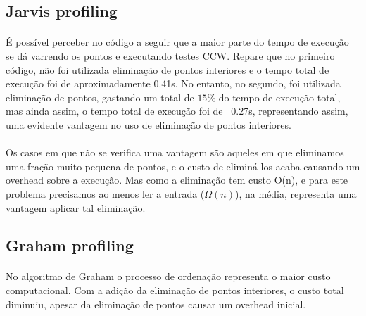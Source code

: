 \documentclass[11pt,a4paper]{article}
\begin{document}
        \subsection{Jarvis profiling}
        \paragraph{}
        É possível perceber no código a seguir que a maior parte do tempo de execução se dá varrendo os pontos e executando testes CCW. Repare que no primeiro código, não foi utilizada eliminação de pontos interiores e o tempo total de execução foi de aproximadamente 0.41s. No entanto, no segundo, foi utilizada eliminação de pontos, gastando um total de $15\%$ do tempo de execução total, mas ainda assim, o tempo total de execução foi de ~0.27s, representando assim, uma evidente vantagem no uso de eliminação de pontos interiores.

        \paragraph{}
        Os casos em que não se verifica uma vantagem são aqueles em que eliminamos uma fração muito pequena de pontos, e o custo de eliminá-los acaba causando um overhead sobre a execução. Mas como a eliminação tem custo O(n), e para este problema precisamos ao menos ler a entrada ($\Omega(n)$), na média, representa uma vantagem aplicar tal eliminação.

        \subsection{Graham profiling}
        \paragraph{}
        No algoritmo de Graham o processo de ordenação representa o maior custo computacional. Com a adição da eliminação de pontos interiores, o custo total diminuiu, apesar da eliminação de pontos causar um overhead inicial.
\end{document}
